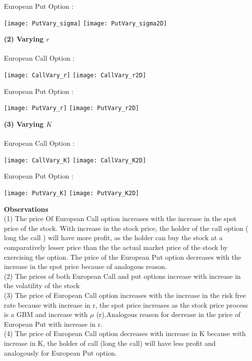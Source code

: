 \documentclass{article}
\begin{document}
European Put Option :
\begin{center}
\texttt{[image: PutVary\_sigma]}
\quad \quad
\texttt{[image: PutVary\_sigma2D]}\\
\end{center}

\textbf{(2) Varying $r$}\\\\
European Call Option :
\begin{center}
\texttt{[image: CallVary\_r]}
\quad \quad
\texttt{[image: CallVary\_r2D]}\\
\end{center}

European Put Option :
\begin{center}
\texttt{[image: PutVary\_r]}
\quad \quad
\texttt{[image: PutVary\_r2D]}\\
\end{center}

\textbf{(3) Varying $K$}\\\\
European Call Option :
\begin{center}
\texttt{[image: CallVary\_K]}
\quad \quad
\texttt{[image: CallVary\_K2D]}\\
\end{center}
\newpage
European Put Option :
\begin{center}
\texttt{[image: PutVary\_K]}
\quad \quad
\texttt{[image: PutVary\_K2D]}
\end{center}

\textbf{Observations}\\
(1) The price Of European Call option increases with the increase in the spot price of the stock. With increase in the stock price, the holder of the call option ( long the call ) will have more profit, as the holder can buy the stock at a comparatively lesser price than the the actual market price of the stock by exercising the option. The price of the European Put option decreases with the increase in the spot price because of analogous reason.\\
(2) The prices of both European Call and put options increase with increase in the volatility of the stock \\
(3) The price of European Call option increases with the increase in the risk free rate because with increase in r, the spot price increases as the stock price process  is a GBM and increase with $\mu$ (r).Analogous reason for decrease in the price of European Put with increase in r.\\
(4) The price of European Call option decreases with increase in K because with increase in K, the holder of call (long the call) will have less profit and analogously for European Put option.
\end{document}
